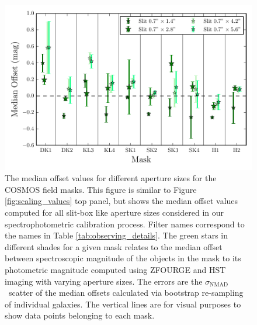\documentclass[iop]{emulateapj}
\newcommand{\NMAD}{$\sigma_{\mathrm{NMAD}}$}
\begin{document}
\begin{figure}[h!]
\includegraphics[scale=1.20]{figures/scaling_values_with_diff_slit_sizes_bs.pdf}
\caption{ The median offset values for different aperture sizes for the COSMOS field masks. This figure is similar to Figure \ref{fig:scaling_values} top panel, but shows the median offset values computed for all slit-box like aperture sizes considered in our spectrophotometric calibration process. 
Filter names correspond to the names in Table \ref{tab:observing_details}.
The green stars in different shades for a given mask relates to the median offset between spectroscopic magnitude of the objects in the mask to its photometric magnitude computed using ZFOURGE and HST imaging with varying aperture sizes. 
The errors are the \NMAD\ scatter of the median offsets calculated via bootstrap re-sampling of individual galaxies. 
The vertical lines are for visual purposes to show data points belonging to each mask. 
}
\label{fig:scaling_values_varying_slit_boxes}
\end{figure}
\end{document}
